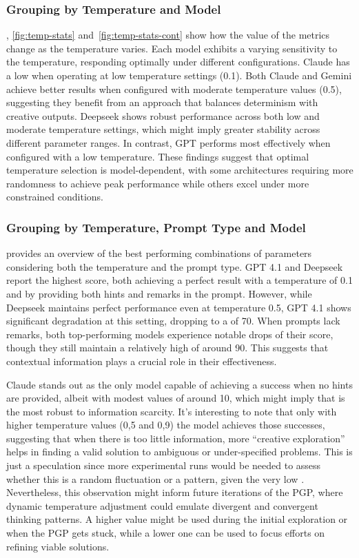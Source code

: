 \documentclass[12pt,a4paper,openright,twoside]{book}
\begin{document}
\subsubsection{Grouping by Temperature and Model}

, \cref{fig:temp-stats} and~\cref{fig:temp-stats-cont} show how the value of the metrics change as the temperature varies.
%
Each model exhibits a varying sensitivity to the temperature, responding optimally under different configurations.
%
Claude has a low \TSR{} when operating at low temperature settings (0.1).
%
Both Claude and Gemini achieve better results when configured with moderate temperature values (0.5), suggesting they benefit from an approach that balances determinism with creative outputs.
%
Deepseek shows robust performance across both low and moderate temperature settings, which might imply greater stability across different parameter ranges. 
%
In contrast, GPT performs most effectively when configured with a low temperature.
%
These findings suggest that optimal temperature selection is model-dependent, with some architectures requiring more randomness to achieve peak performance while others excel under more constrained conditions.

\subsubsection{Grouping by Temperature, Prompt Type and Model}

 provides an overview of the best performing combinations of parameters considering both the temperature and the prompt type.
%
GPT 4.1 and Deepseek report the highest \TSR{} score, both achieving a perfect result with a temperature of 0.1 and by providing both hints and remarks in the prompt.
%
However, while Deepseek maintains perfect performance even at temperature 0.5, GPT 4.1 shows significant degradation at this setting, dropping to a \TSR{} of 70.
%
When prompts lack remarks, both top-performing models experience notable drops of their score, though they still maintain a relatively high \TSR{} of around 90. 
%
This suggests that contextual information plays a crucial role in their effectiveness.

Claude stands out as the only model capable of achieving a success when no hints are provided, albeit with modest \TSR{} values of around 10, which might imply that is the most robust to information scarcity.
%
It's interesting to note that only with higher temperature values (0,5 and 0,9) the model achieves those successes, suggesting that when there is too little information, more ``creative exploration'' helps in finding a valid solution to ambiguous or under-specified problems.
%
This is just a speculation since more experimental runs would be needed to assess whether this is a random fluctuation or a pattern, given the very low \TSR{}.
%
Nevertheless, this observation might inform future iterations of the \ac{PGP}, where dynamic temperature adjustment could emulate divergent and convergent thinking patterns. 
%
A higher value might be used during the initial exploration or when the \ac{PGP} gets stuck, while a lower one can be used to focus efforts on refining viable solutions.
\end{document}
